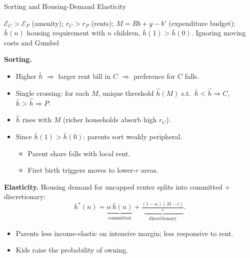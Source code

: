 \documentclass[11pt,aspectratio=169]{beamer}
\begin{document}

\begin{frame}{Sorting and Housing-Demand Elasticity}
\label{slide1-main}

\footnotesize

$\mathcal E_C > \mathcal E_P$ (amenity); $r_C > r_P$ (rents); $M = Rb + y - b'$ (expenditure budget);\\ $\bar h(n)$ housing requirement with $n$ children, $\bar h(1) > \bar h(0)$. Ignoring moving costs and Gumbel

\vspace{0.3em}
\textbf{Sorting.}
\begin{itemize}\setlength\itemsep{1pt}
  \item Higher $\bar h$ $\Rightarrow$ larger rent bill in $C$ $\Rightarrow$ preference for $C$ falls.
  \item Single crossing: for each $M$, unique threshold $\hat h(M)$ s.t.\ $\bar h < \hat h \Rightarrow C$,\; $\bar h > \hat h \Rightarrow P$.
  \item $\hat h$ rises with $M$ (richer households absorb high $r_C$).
  \item Since $\bar h(1) > \bar h(0)$: parents sort weakly peripheral.
  \begin{itemize}\scriptsize
    \item Parent share falls with local rent.
    \item First birth triggers moves to lower-$r$ areas.
  \end{itemize}
\end{itemize}

\vspace{0.2em}
\textbf{Elasticity.}\;
Housing demand for uncapped renter splits into committed $+$ discretionary:
\vspace{-0.5em}
\[
h^\ast(n) = \underbrace{\alpha\,\bar h(n)}_{\text{committed}} + \underbrace{\tfrac{(1-\alpha)(M-\bar c)}{r}}_{\text{discretionary}}.
\]
\vspace{-0.8em}
  \begin{itemize}\scriptsize
    \item Parents less income-elastic on intensive margin; less responsive to rent.
    \item Kids raise the probability of owning.
  \end{itemize}

\end{frame}
\end{document}

